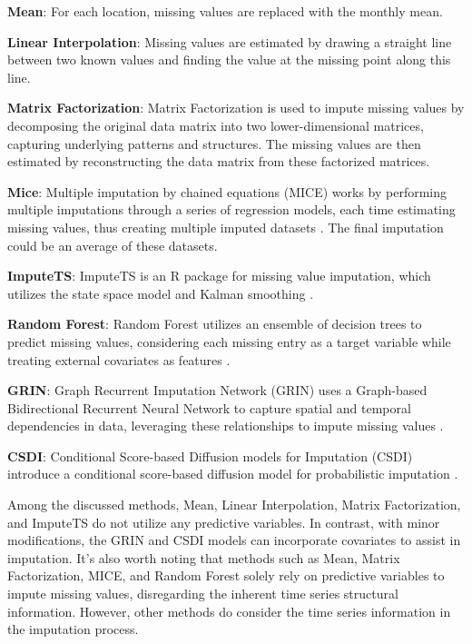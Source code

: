 \documentclass[review]{elsarticle}
\begin{document}
\begin{description}
	\item \textbf{Mean}: For each location, missing values are replaced with the monthly mean.
	\item \textbf{Linear Interpolation}: Missing values are estimated by drawing a straight line between two known values and finding the value at the missing point along this line.
	\item \textbf{Matrix Factorization}: Matrix Factorization is used to impute missing values by decomposing the original data matrix into two lower-dimensional matrices, capturing underlying patterns and structures. The missing values are then estimated by reconstructing the data matrix from these factorized matrices.
	\item \textbf{Mice}: Multiple imputation by chained equations (MICE) works by performing multiple imputations through a series of regression models, each time estimating missing values, thus creating multiple imputed datasets \citep{white2011multiple}. The final imputation could be an average of these datasets.
	\item \textbf{ImputeTS}:  ImputeTS is an R package for missing value imputation, which utilizes the state space model and Kalman smoothing \citep{moritz2017imputets}.
	\item \textbf{Random Forest}: Random Forest utilizes an ensemble of decision trees to predict missing values, considering each missing entry as a target variable while treating external covariates as features \citep{breiman2001random}.
	\item \textbf{GRIN}: Graph Recurrent Imputation Network (GRIN) uses a Graph-based Bidirectional Recurrent Neural Network to capture spatial and temporal dependencies in data, leveraging these relationships to impute missing values \citep{cini2021filling}.
	\item \textbf{CSDI}: Conditional Score-based Diffusion models for Imputation (CSDI) introduce a conditional score-based diffusion model for probabilistic imputation \citep{tashiro2021csdi}.
\end{description}


Among the discussed methods, Mean, Linear Interpolation, Matrix Factorization, and ImputeTS do not utilize any predictive variables. In contrast, with minor modifications, the GRIN and CSDI models can incorporate covariates to assist in imputation. It's also worth noting that methods such as Mean, Matrix Factorization, MICE, and Random Forest solely rely on predictive variables to impute missing values, disregarding the inherent time series structural information. However, other methods do consider the time series information in the imputation process.
\end{document}
